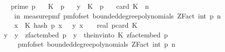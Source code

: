 \begin{isabellebody}
\ \ \ {\isachardoublequoteopen}prime\ p{\isachardoublequoteclose}\isanewline
\ \ \ {\isachardoublequoteopen}K\ {\isasymsubseteq}\ {\isacharbraceleft}{\kern0pt}{}{\isachardot}{\kern0pt}{\isachardot}{\kern0pt}{\isacharless}{\kern0pt}p{\isacharbraceright}{\kern0pt}{\isachardoublequoteclose}\isanewline
\ \ \ {\isachardoublequoteopen}y\ {\isacharbackquote}{\kern0pt}\ K\ {\isasymsubseteq}\ {\isacharbraceleft}{\kern0pt}{}{\isachardot}{\kern0pt}{\isachardot}{\kern0pt}{\isacharless}{\kern0pt}p{\isacharbraceright}{\kern0pt}{\isachardoublequoteclose}\isanewline
\ \ \ {\isachardoublequoteopen}card\ K\ {\isasymle}\ n{\isachardoublequoteclose}\isanewline
\ \ \ {\isachardoublequoteopen}{\isasymP}{\isacharparenleft}{\kern0pt}{\isasymomega}\ in\ measure{\isacharunderscore}{\kern0pt}pmf\ {\isacharparenleft}{\kern0pt}pmf{\isacharunderscore}{\kern0pt}of{\isacharunderscore}{\kern0pt}set\ {\isacharparenleft}{\kern0pt}bounded{\isacharunderscore}{\kern0pt}degree{\isacharunderscore}{\kern0pt}polynomials\ {\isacharparenleft}{\kern0pt}ZFact\ {\isacharparenleft}{\kern0pt}int\ p{\isacharparenright}{\kern0pt}{\isacharparenright}{\kern0pt}\ n{\isacharparenright}{\kern0pt}{\isacharparenright}{\kern0pt}{\isachardot}{\kern0pt}\isanewline
\ \ \ \ {\isacharparenleft}{\kern0pt}{\isasymforall}x\ {\isasymin}\ K{\isachardot}{\kern0pt}\ hash\ p\ x\ {\isasymomega}\ {\isacharequal}{\kern0pt}\ {\isacharparenleft}{\kern0pt}y\ x{\isacharparenright}{\kern0pt}{\isacharparenright}{\kern0pt}{\isacharparenright}{\kern0pt}\ {\isacharequal}{\kern0pt}\ {}\ {\isacharslash}{\kern0pt}\ real\ p{\isacharcircum}{\kern0pt}card\ K{\isachardoublequoteclose}\isanewline
%
\isadelimproof
%
\endisadelimproof
%
\isatagproof
{}\isamarkupfalse%
\ {\isacharminus}{\kern0pt}\isanewline
\ \ \isamarkupfalse%
\ y{\isacharprime}{\kern0pt}\ \ {\isachardoublequoteopen}y{\isacharprime}{\kern0pt}\ {\isacharequal}{\kern0pt}\ zfact{\isacharunderscore}{\kern0pt}embed\ p\ {\isasymcirc}\ y\ {\isasymcirc}\ {\isacharparenleft}{\kern0pt}the{\isacharunderscore}{\kern0pt}inv{\isacharunderscore}{\kern0pt}into\ K\ {\isacharparenleft}{\kern0pt}zfact{\isacharunderscore}{\kern0pt}embed\ p{\isacharparenright}{\kern0pt}{\isacharparenright}{\kern0pt}{\isachardoublequoteclose}\isanewline
\ \ \isamarkupfalse%
\ {\isasymOmega}\ \ {\isachardoublequoteopen}{\isasymOmega}\ {\isacharequal}{\kern0pt}\ pmf{\isacharunderscore}{\kern0pt}of{\isacharunderscore}{\kern0pt}set\ {\isacharparenleft}{\kern0pt}bounded{\isacharunderscore}{\kern0pt}degree{\isacharunderscore}{\kern0pt}polynomials\ {\isacharparenleft}{\kern0pt}ZFact\ {\isacharparenleft}{\kern0pt}int\ p{\isacharparenright}{\kern0pt}{\isacharparenright}{\kern0pt}\ n{\isacharparenright}{\kern0pt}{\isachardoublequoteclose}\isanewline

\end{isabellebody}

